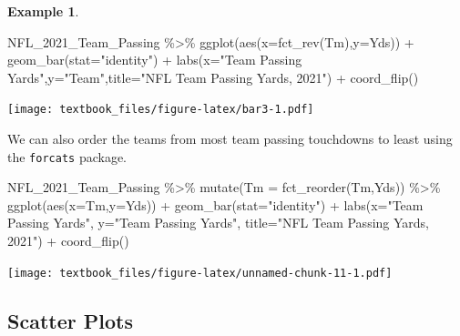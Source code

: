 \documentclass[
  11pt,
]{book}
\newenvironment{Shaded}{\begin{snugshade}}{\end{snugshade}}
\newcommand{\AttributeTok}[1]{\textcolor[rgb]{0.77,0.63,0.00}{#1}}
\newcommand{\FunctionTok}[1]{\textcolor[rgb]{0.00,0.00,0.00}{#1}}
\newcommand{\NormalTok}[1]{#1}
\newcommand{\SpecialCharTok}[1]{\textcolor[rgb]{0.00,0.00,0.00}{#1}}
\newcommand{\StringTok}[1]{\textcolor[rgb]{0.31,0.60,0.02}{#1}}
\theoremstyle{definition}
\theoremstyle{definition}
\newtheorem{example}{Example}[chapter]
\theoremstyle{definition}
\theoremstyle{definition}
\theoremstyle{remark}
\begin{document}
\begin{example}
\begin{Shaded}
\begin{Highlighting}[]
\NormalTok{NFL\_2021\_Team\_Passing }\SpecialCharTok{\%\textgreater{}\%} 
  \FunctionTok{ggplot}\NormalTok{(}\FunctionTok{aes}\NormalTok{(}\AttributeTok{x=}\FunctionTok{fct\_rev}\NormalTok{(Tm),}\AttributeTok{y=}\NormalTok{Yds)) }\SpecialCharTok{+}
  \FunctionTok{geom\_bar}\NormalTok{(}\AttributeTok{stat=}\StringTok{"identity"}\NormalTok{) }\SpecialCharTok{+}
  \FunctionTok{labs}\NormalTok{(}\AttributeTok{x=}\StringTok{"Team Passing Yards"}\NormalTok{,}\AttributeTok{y=}\StringTok{"Team"}\NormalTok{,}\AttributeTok{title=}\StringTok{"NFL Team Passing Yards, 2021"}\NormalTok{) }\SpecialCharTok{+}
  \FunctionTok{coord\_flip}\NormalTok{()}
\end{Highlighting}
\end{Shaded}

\texttt{[image: textbook\_files/figure-latex/bar3-1.pdf]}
\end{example}

\vfill
\newpage

We can also order the teams from most team passing touchdowns to least using the \texttt{forcats} package.

\begin{Shaded}
\begin{Highlighting}[]
\NormalTok{NFL\_2021\_Team\_Passing }\SpecialCharTok{\%\textgreater{}\%} 
  \FunctionTok{mutate}\NormalTok{(}\AttributeTok{Tm =} \FunctionTok{fct\_reorder}\NormalTok{(Tm,Yds)) }\SpecialCharTok{\%\textgreater{}\%}
  \FunctionTok{ggplot}\NormalTok{(}\FunctionTok{aes}\NormalTok{(}\AttributeTok{x=}\NormalTok{Tm,}\AttributeTok{y=}\NormalTok{Yds)) }\SpecialCharTok{+}
  \FunctionTok{geom\_bar}\NormalTok{(}\AttributeTok{stat=}\StringTok{"identity"}\NormalTok{) }\SpecialCharTok{+}
  \FunctionTok{labs}\NormalTok{(}\AttributeTok{x=}\StringTok{"Team Passing Yards"}\NormalTok{,}
       \AttributeTok{y=}\StringTok{"Team Passing Yards"}\NormalTok{,}
       \AttributeTok{title=}\StringTok{"NFL Team Passing Yards, 2021"}\NormalTok{) }\SpecialCharTok{+}
  \FunctionTok{coord\_flip}\NormalTok{()}
\end{Highlighting}
\end{Shaded}

\texttt{[image: textbook\_files/figure-latex/unnamed-chunk-11-1.pdf]}

\vfill
\newpage

\hypertarget{scatter-plots}{%
\subsection{Scatter Plots}\label{scatter-plots}}
\end{document}
